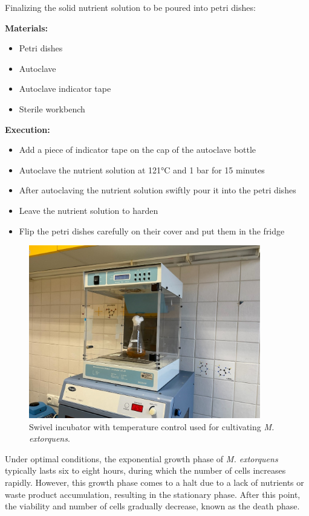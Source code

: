 Finalizing the solid nutrient solution to be poured into petri dishes:

\textbf{Materials:}

\begin{itemize}
    \item Petri dishes
    \item Autoclave
    \item Autoclave indicator tape
    \item Sterile workbench
\end{itemize}


\textbf{Execution:}

\begin{itemize}
    \item Add a piece of indicator tape on the cap of the autoclave bottle
    \item Autoclave the nutrient solution at 121°C and 1 bar for 15 minutes
    \item After autoclaving the nutrient solution swiftly pour it into the petri dishes
    \item Leave the nutrient solution to harden
    \item Flip the petri dishes carefully on their cover and put them in the fridge
\end{itemize}

\begin{figure}[H]
    \centering
    \includegraphics[width=0.9\textwidth]{./media/images/swivel_incubator}
    \caption{Swivel incubator with temperature control used for cultivating \emph{M. extorquens}.}
    \label{fig:swivel_incubator}
\end{figure}

Under optimal conditions, the exponential growth phase of \emph{M. extorquens} typically lasts six to eight hours, during which the number of cells increases rapidly.
However, this growth phase comes to a halt due to a lack of nutrients or waste product accumulation, resulting in the stationary phase.
After this point, the viability and number of cells gradually decrease, known as the death phase.


